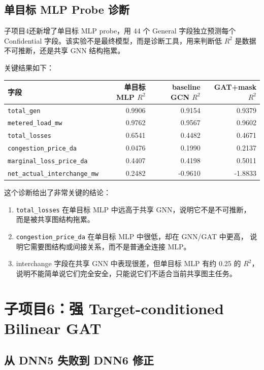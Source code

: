 \documentclass[UTF8,a4paper,11pt]{ctexart}
\begin{document}
\subsection{单目标 MLP Probe 诊断}

子项目4还新增了单目标 MLP probe，用 44 个 General 字段独立预测每个
Confidential 字段。该实验不是最终模型，而是诊断工具，用来判断低 $R^2$ 是数据
不可推断，还是共享 GNN 结构拖累。

关键结果如下：
\begin{center}
\begin{tabular}{lrrr}
\toprule
字段 & 单目标 MLP $R^2$ & baseline GCN $R^2$ & GAT+mask $R^2$ \\
\midrule
\texttt{total\_gen} & 0.9906 & 0.9154 & 0.9379 \\
\texttt{metered\_load\_mw} & 0.9762 & 0.9567 & 0.9602 \\
\texttt{total\_losses} & 0.6541 & 0.4482 & 0.4671 \\
\texttt{congestion\_price\_da} & 0.0476 & 0.1990 & 0.2137 \\
\texttt{marginal\_loss\_price\_da} & 0.4407 & 0.4198 & 0.5011 \\
\texttt{net\_actual\_interchange\_mw} & 0.2482 & -0.9610 & -1.8833 \\
\bottomrule
\end{tabular}
\end{center}

这个诊断给出了非常关键的结论：
\begin{enumerate}
  \item \texttt{total\_losses} 在单目标 MLP 中远高于共享 GNN，说明它不是不可推断，
  而是被共享图结构拖累。
  \item \texttt{congestion\_price\_da} 在单目标 MLP 中很低，却在 GNN/GAT 中更高，
  说明它需要图结构或间接关系，而不是普通全连接 MLP。
  \item interchange 字段在共享 GNN 中表现很差，但单目标 MLP 有约 0.25 的 $R^2$，
  说明不能简单说它们完全安全，只能说它们不适合当前共享图主任务。
\end{enumerate}

\section{子项目6：强 Target-conditioned Bilinear GAT}

\subsection{从 DNN5 失败到 DNN6 修正}
\end{document}
